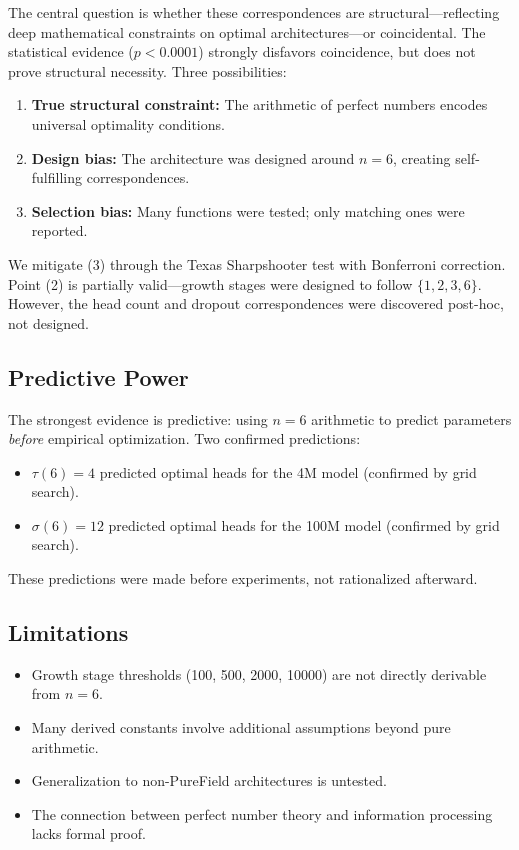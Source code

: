 \documentclass[12pt]{article}
\begin{document}
The central question is whether these correspondences are structural---reflecting deep mathematical constraints on optimal architectures---or coincidental. The statistical evidence ($p < 0.0001$) strongly disfavors coincidence, but does not prove structural necessity. Three possibilities:

\begin{enumerate}
    \item \textbf{True structural constraint:} The arithmetic of perfect numbers encodes universal optimality conditions.
    \item \textbf{Design bias:} The architecture was designed around $n = 6$, creating self-fulfilling correspondences.
    \item \textbf{Selection bias:} Many functions were tested; only matching ones were reported.
\end{enumerate}

We mitigate (3) through the Texas Sharpshooter test with Bonferroni correction. Point (2) is partially valid---growth stages were designed to follow $\{1, 2, 3, 6\}$. However, the head count and dropout correspondences were discovered post-hoc, not designed.

\subsection{Predictive Power}

The strongest evidence is predictive: using $n = 6$ arithmetic to predict parameters \emph{before} empirical optimization. Two confirmed predictions:

\begin{itemize}
    \item $\tau(6) = 4$ predicted optimal heads for the 4M model (confirmed by grid search).
    \item $\sigma(6) = 12$ predicted optimal heads for the 100M model (confirmed by grid search).
\end{itemize}

These predictions were made before experiments, not rationalized afterward.

\subsection{Limitations}

\begin{itemize}
    \item Growth stage thresholds (100, 500, 2000, 10000) are not directly derivable from $n = 6$.
    \item Many derived constants involve additional assumptions beyond pure arithmetic.
    \item Generalization to non-PureField architectures is untested.
    \item The connection between perfect number theory and information processing lacks formal proof.
\end{itemize}
\end{document}
